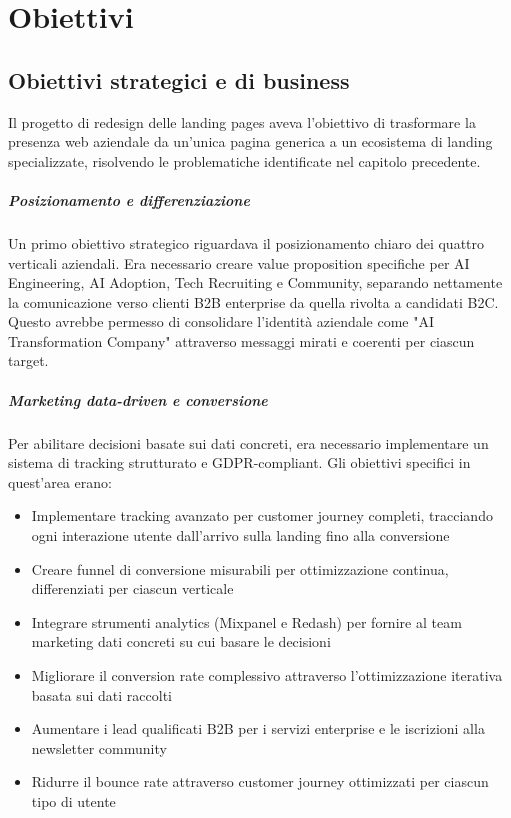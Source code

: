 \chapter{Obiettivi}

\section{Obiettivi strategici e di business}
Il progetto di redesign delle landing pages aveva l'obiettivo di 
trasformare la presenza web aziendale da un'unica pagina generica a un 
ecosistema di landing specializzate, risolvendo le problematiche 
identificate nel capitolo precedente.

\paragraph{Posizionamento e differenziazione}
Un primo obiettivo strategico riguardava il posizionamento chiaro dei 
quattro verticali aziendali. Era necessario creare value proposition 
specifiche per AI Engineering, AI Adoption, Tech Recruiting e Community, 
separando nettamente la comunicazione verso clienti B2B enterprise da 
quella rivolta a candidati B2C. Questo avrebbe permesso di consolidare 
l'identità aziendale come "AI Transformation Company" attraverso messaggi 
mirati e coerenti per ciascun target.

\paragraph{Marketing data-driven e conversione}
Per abilitare decisioni basate sui dati concreti, era necessario 
implementare un sistema di tracking strutturato e GDPR-compliant. 
Gli obiettivi specifici in quest'area erano:

\begin{itemize}
  \item Implementare tracking avanzato per customer journey completi, 
        tracciando ogni interazione utente dall'arrivo sulla landing 
        fino alla conversione
  
  \item Creare funnel di conversione misurabili per ottimizzazione 
        continua, differenziati per ciascun verticale
  
  \item Integrare strumenti analytics (Mixpanel e Redash) per fornire 
        al team marketing dati concreti su cui basare le decisioni
  
  \item Migliorare il conversion rate complessivo attraverso 
        l'ottimizzazione iterativa basata sui dati raccolti
  
  \item Aumentare i lead qualificati B2B per i servizi enterprise e 
        le iscrizioni alla newsletter community
  
  \item Ridurre il bounce rate attraverso customer journey ottimizzati 
        per ciascun tipo di utente
\end{itemize}

